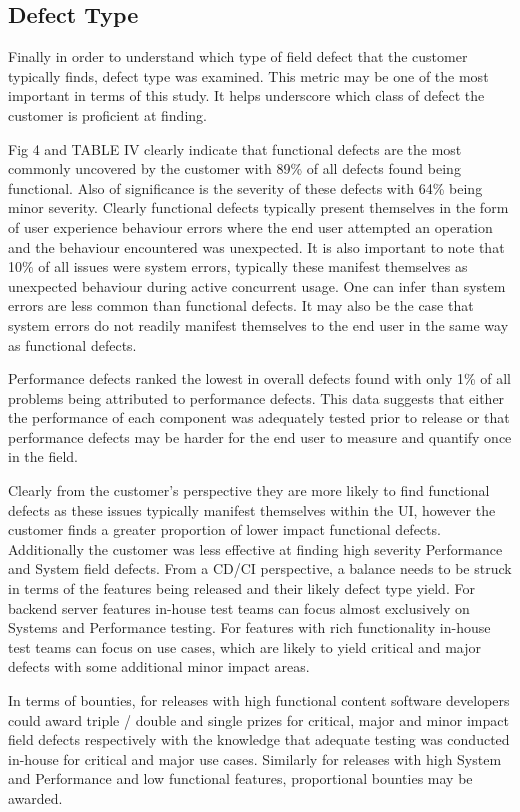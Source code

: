 \documentclass[conference]{IEEEtran}
\begin{document}
\subsection{Defect Type}
Finally in order to understand which type of field defect that the customer typically finds, defect type was examined. This metric may be one of the most important in terms of this study. It helps underscore which class of defect the customer is proficient at finding. \par
Fig 4 and TABLE IV clearly indicate that functional defects are the most commonly uncovered by the customer with 89\% of all defects found being functional. Also of significance is the severity of these defects with 64\% being minor severity. Clearly functional defects typically present themselves in the form of user experience behaviour errors where the end user attempted an operation and the behaviour encountered was unexpected. It is also important to note that 10\% of all issues were system errors, typically these manifest themselves as unexpected behaviour during active concurrent usage. One can infer than system errors are less common than functional defects. It may also be the case that system errors do not readily manifest themselves to the end user in the same way as functional defects. \par
Performance defects ranked the lowest in overall defects found with only 1\% of all problems being attributed to performance defects.  This data suggests that either the performance of each component was adequately tested prior to release or that performance defects may be harder for the end user to measure and quantify once in the field.  \par
Clearly from the customer's perspective they are more likely to find functional defects as these issues typically manifest themselves within the UI, however the customer finds a greater proportion of lower impact functional defects. Additionally the customer was less effective at finding high severity Performance and System field defects. From a CD/CI perspective, a balance needs to be struck in terms of the features being released and their likely defect type yield. For backend server features in-house test teams can focus almost exclusively on Systems and Performance testing. For features with rich functionality in-house test teams can focus on use cases, which are likely to yield critical and major defects with some additional minor impact areas. \par
In terms of bounties, for releases with high functional content software developers could award triple / double and single prizes for critical, major and minor impact field defects respectively with the knowledge that adequate testing was conducted in-house for critical and major use cases. Similarly for releases with high System and Performance and low functional features, proportional bounties may be awarded.
\end{document}
